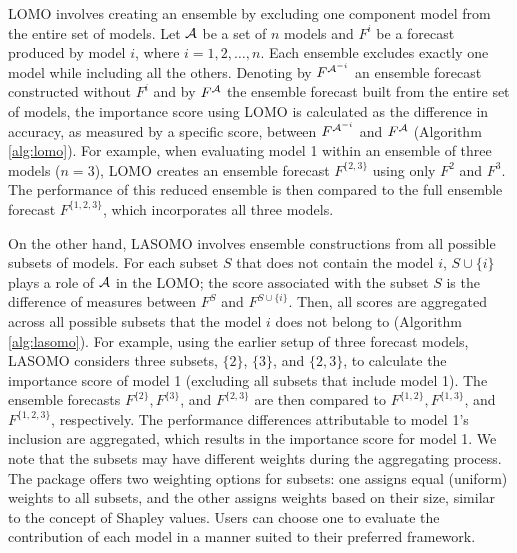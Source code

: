 \documentclass[
  article,
  shortnames,
  notitle]{jss}
\begin{document}
LOMO involves creating an ensemble by excluding one component model from
the entire set of models. Let \({\cal A}\) be a set of \(n\) models and
\(F^i\) be a forecast produced by model \(i\), where
\(i = 1,2, \dots, n.\) Each ensemble excludes exactly one model while
including all the others. Denoting by \(F^{{\cal A}^{-i}}\) an ensemble
forecast constructed without \(F^i\) and by \(F^{\cal A}\) the ensemble
forecast built from the entire set of models, the importance score using
LOMO is calculated as the difference in accuracy, as measured by a
specific score, between \(F^{{\cal A}^{-i}}\) and \(F^{\cal A}\)
(Algorithm \ref{alg:lomo}). For example, when evaluating model 1 within
an ensemble of three models (\(n=3\)), LOMO creates an ensemble forecast
\(F^{\{2,3\}}\) using only \(F^2\) and \(F^3\). The performance of this
reduced ensemble is then compared to the full ensemble forecast
\(F^{\{1,2,3\}}\), which incorporates all three models.

On the other hand, LASOMO involves ensemble constructions from all
possible subsets of models. For each subset \(S\) that does not contain
the model \(i\), \(S \cup \{i\}\) plays a role of \({\cal A}\) in the
LOMO; the score associated with the subset \(S\) is the difference of
measures between \(F^S\) and \(F^{S \cup \{i\}}\). Then, all scores are
aggregated across all possible subsets that the model \(i\) does not
belong to (Algorithm \ref{alg:lasomo}). For example, using the earlier
setup of three forecast models, LASOMO considers three subsets,
\(\{2\}\), \(\{3\}\), and \(\{2, 3\}\), to calculate the importance
score of model 1 (excluding all subsets that include model 1). The
ensemble forecasts \(F^{\{2\}}, F^{\{3\}}\), and \(F^{\{2,3\}}\) are
then compared to \(F^{\{1,2\}}, F^{\{1,3\}}\), and \(F^{\{1,2,3\}}\),
respectively. The performance differences attributable to model 1's
inclusion are aggregated, which results in the importance score for
model 1. We note that the subsets may have different weights during the
aggregating process. The  package offers two
weighting options for subsets: one assigns equal (uniform) weights to
all subsets, and the other assigns weights based on their size, similar
to the concept of Shapley values. Users can choose one to evaluate the
contribution of each model in a manner suited to their preferred
framework.
\end{document}
